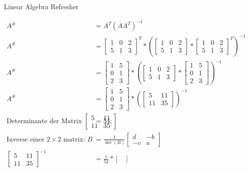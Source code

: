 \documentclass[
	english,
        solution=true
	]{tudaexercise}
\begin{document}
\begin{task}[points=28]{Linear Algebra Refresher}
\begin{subtask}[points=3,title=Matrix Pseudoinverse applied]
\begin{solution}
\begin{align*}
    A^\# &= A^T(AA^T)^{-1}\\
    A^\# &= \begin{bmatrix}
        1 & 0 & 2 \\ 5 & 1 & 3
    \end{bmatrix}^T*(\begin{bmatrix}
        1 & 0 & 2 \\ 5 & 1 & 3
    \end{bmatrix}*\begin{bmatrix}
        1 & 0 & 2 \\ 5 & 1 & 3
    \end{bmatrix}^T)^{-1}\\
    A^\# &= \begin{bmatrix}
        1 & 5 \\ 0 & 1 \\ 2 & 3
    \end{bmatrix}*(\begin{bmatrix}
        1 & 0 & 2 \\ 5 & 1 & 3
    \end{bmatrix}*\begin{bmatrix}
        1 & 5 \\ 0 & 1 \\ 2 & 3
    \end{bmatrix})^{-1}\\
    A^\# &= \begin{bmatrix}
        1 & 5 \\ 0 & 1 \\ 2 & 3
    \end{bmatrix}*(\begin{bmatrix}
        5 & 11 \\ 11 & 35
    \end{bmatrix})^{-1}\\
    \text{Determinante der Matrix $\begin{bmatrix}
        5 & 11 \\ 11 & 35
    \end{bmatrix}$}&=54;\\ \text{Inverse einer $2\times 2$ matrix: }B&=\frac{1}{\det (B)}\begin{bmatrix}
        d & -b \\ -c & a
    \end{bmatrix}\\
    \begin{bmatrix}
        5 & 11 \\ 11 & 35
    \end{bmatrix}^{-1}&=\frac{1}{54}*\begin{bmatrix}

\end{bmatrix}
\end{align*}
\end{solution}
\end{subtask}
\end{task}
\end{document}
